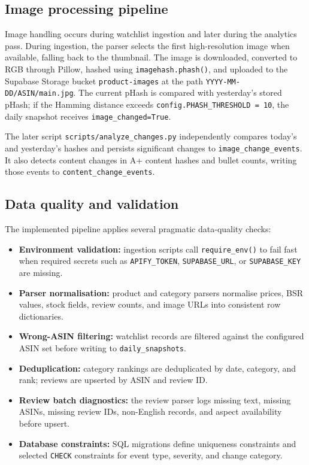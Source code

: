 \subsection{Image processing pipeline}

Image handling occurs during watchlist ingestion and later during the
analytics pass. During ingestion, the parser selects the first
high-resolution image when available, falling back to the thumbnail. The
image is downloaded, converted to RGB through Pillow, hashed using
\texttt{imagehash.phash()}, and uploaded to the Supabase Storage bucket
\texttt{product-images} at the path
\texttt{YYYY-MM-DD/ASIN/main.jpg}. The current pHash is compared with
yesterday's stored pHash; if the Hamming distance exceeds
\texttt{config.PHASH\_THRESHOLD = 10}, the daily snapshot receives
\texttt{image\_changed=True}.

The later script \texttt{scripts/analyze\_changes.py} independently
compares today's and yesterday's hashes and persists significant changes
to \texttt{image\_change\_events}. It also detects content changes in
A+ content hashes and bullet counts, writing those events to
\texttt{content\_change\_events}.

\subsection{Data quality and validation}

The implemented pipeline applies several pragmatic data-quality checks:
\begin{itemize}
    \item \textbf{Environment validation:} ingestion scripts call
    \texttt{require\_env()} to fail fast when required secrets such as
    \texttt{APIFY\_TOKEN}, \texttt{SUPABASE\_URL}, or
    \texttt{SUPABASE\_KEY} are missing.
    \item \textbf{Parser normalisation:} product and category parsers
    normalise prices, BSR values, stock fields, review counts, and image
    URLs into consistent row dictionaries.
    \item \textbf{Wrong-ASIN filtering:} watchlist records are filtered
    against the configured ASIN set before writing to
    \texttt{daily\_snapshots}.
    \item \textbf{Deduplication:} category rankings are deduplicated by
    date, category, and rank; reviews are upserted by ASIN and review ID.
    \item \textbf{Review batch diagnostics:} the review parser logs
    missing text, missing ASINs, missing review IDs, non-English records,
    and aspect availability before upsert.
    \item \textbf{Database constraints:} SQL migrations define uniqueness
    constraints and selected \texttt{CHECK} constraints for event type,
    severity, and change category.
\end{itemize}


